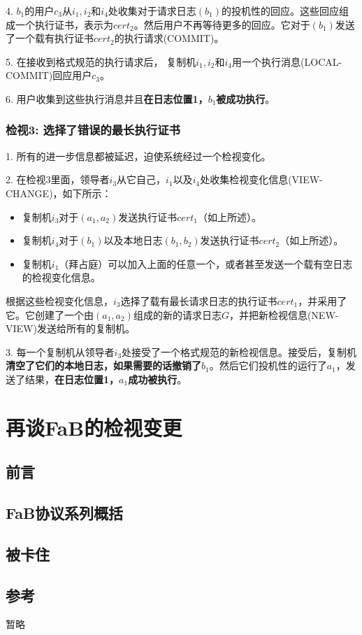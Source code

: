 \documentclass[UTF8]{ctexart}
\begin{document}
4. $b_1$的用户$c_3$从$i_1, i_2$和$i_4$处收集对于请求日志$(b_1)$的投机性的回应。这些回应组成一个执行证书，表示为$cert_2$。然后用户不再等待更多的回应。它对于$(b_1)$发送了一个载有执行证书$cert_2$的执行请求(COMMIT)。

5. 在接收到格式规范的执行请求后， 复制机$i_1, i_2$和$i_4$用一个执行消息(LOCAL-COMMIT)回应用户$c_3$。

6. 用户收集到这些执行消息并且\textbf{在日志位置1，$b_1$被成功执行}。
\subsubsection*{检视3: 选择了错误的最长执行证书}
1. 所有的进一步信息都被延迟，迫使系统经过一个检视变化。

2. 在检视$3$里面，领导者$i_3$从它自己，$i_1$以及$i_4$处收集检视变化信息(VIEW-CHANGE)，如下所示：
\begin{itemize}
	\item 复制机$i_3$对于$(a_1, a_2)$发送执行证书$cert_1$（如上所述）。
	\item 复制机$i_4$对于$(b_1)$以及本地日志$(b_1, b_2)$发送执行证书$cert_2$（如上所述）。
	\item 复制机$i_1$（拜占庭）可以加入上面的任意一个，或者甚至发送一个载有空日志的检视变化信息。
\end{itemize}
根据这些检视变化信息，$i_3$选择了载有最长请求日志的执行证书$cert_1$，并采用了它。它创建了一个由$(a_1, a_2)$组成的新的请求日志$G$，并把新检视信息(NEW-VIEW)发送给所有的复制机。

3. 每一个复制机从领导者$i_3$处接受了一个格式规范的新检视信息。接受后，复制机\textbf{清空了它们的本地日志，如果需要的话撤销了$b_1$}。然后它们投机性的运行了$a_1$，发送了结果，\textbf{在日志位置1，$a_1$成功被执行}。

\section{再谈FaB的检视变更}\label{sec:FaB}
\subsection{前言}

\subsection{FaB协议系列概括}

\subsection{被卡住}

\subsection*{参考}
暂略
\end{document}
